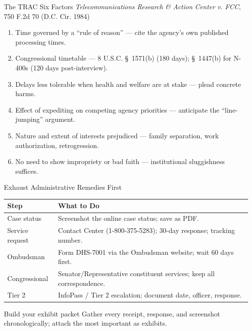 \documentclass[aspectratio=169,11pt]{beamer}
\begin{document}
	\begin{frame}{The TRAC Six Factors}
		\small
		\emph{Telecommunications Research \& Action Center v. FCC}, 750 F.2d 70 (D.C. Cir. 1984)
		\begin{enumerate}
			\item Time governed by a ``rule of reason'' --- cite the agency's own published processing times.
			\item Congressional timetable --- 8 U.S.C. \S~1571(b) (180 days); \S~1447(b) for N-400s (120 days post-interview).
			\item Delays less tolerable when health and welfare are at stake --- plead concrete harms.
			\item Effect of expediting on competing agency priorities --- anticipate the ``line-jumping'' argument.
			\item Nature and extent of interests prejudiced --- family separation, work authorization, retrogression.
			\item No need to show impropriety or bad faith --- institutional sluggishness suffices.
		\end{enumerate}
	\end{frame}
	
	\begin{frame}{Exhaust Administrative Remedies First}
		\small
		\begin{table}
			\centering
			\begin{tabular}{@{}ll@{}}
				\toprule
				\textbf{Step} & \textbf{What to Do} \\
				\midrule
				Case status & Screenshot the online case status; save as PDF. \\
				Service request & Contact Center (1-800-375-5283); 30-day response; tracking number. \\
				Ombudsman & Form DHS-7001 via the Ombudsman website; wait 60 days first. \\
				Congressional & Senator/Representative constituent services; keep all correspondence. \\
				Tier 2 & InfoPass / Tier 2 escalation; document date, officer, response. \\
				\bottomrule
			\end{tabular}
		\end{table}
		\begin{alertblock}{Build your exhibit packet}
			\small Gather every receipt, response, and screenshot chronologically; attach the most important as exhibits.
		\end{alertblock}
	\end{frame}
	
\end{document}
